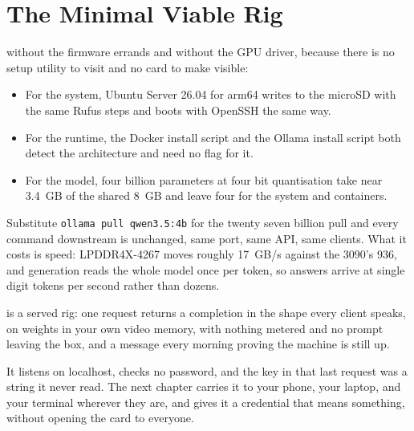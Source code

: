 \section{The Minimal Viable Rig}

 without the firmware errands and
without the GPU driver, because there is no setup utility to visit and no card to
make visible\cite{raspberrypiPi5}:

\begin{itemize}[topsep=0.25em, itemsep=0.4em, parsep=0em]
    \item For the system, Ubuntu Server 26.04 for arm64 writes to the microSD
    with the same Rufus steps and boots with OpenSSH the same way.
    \item For the runtime, the Docker install script and the Ollama install
    script both detect the architecture and need no flag for it.
    \item For the model, four billion parameters at four bit quantisation take
    near 3.4~GB of the shared 8~GB and leave four for the system and containers.
\end{itemize}


 Substitute \texttt{ollama pull qwen3.5:4b}
for the twenty seven billion pull and every command downstream is unchanged, same
port, same API, same clients. What it costs is speed: LPDDR4X-4267 moves roughly
17~GB/s against the 3090's 936, and generation reads the whole model once
per token, so answers arrive at single digit tokens per second rather than
dozens.

\vfill
{} is a served rig: one request returns a completion
in the shape every client speaks, on weights in your own video memory, with
nothing metered and no prompt leaving the box, and a message every morning
proving the machine is still up.

 It listens on localhost,
checks no password, and the key in that last request was a string it never read.
The next chapter carries it to your phone, your laptop, and your terminal
wherever they are, and gives it a credential that means something, without
opening the card to everyone.
